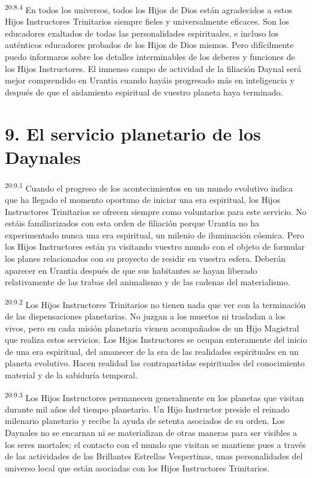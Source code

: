\par
\textsuperscript{20:8.4} En todos los universos, todos los Hijos de Dios están agradecidos a estos Hijos Instructores Trinitarios siempre fieles y universalmente eficaces. Son los educadores exaltados de todas las personalidades espirituales, e incluso los auténticos educadores probados de los Hijos de Dios mismos. Pero difícilmente puedo informaros sobre los detalles interminables de los deberes y funciones de los Hijos Instructores. El inmenso campo de actividad de la filiación Daynal será mejor comprendido en Urantia cuando hayáis progresado más en inteligencia y después de que el aislamiento espiritual de vuestro planeta haya terminado.

\section*{9. El servicio planetario de los Daynales}
\par
\textsuperscript{20:9.1} Cuando el progreso de los acontecimientos en un mundo evolutivo indica que ha llegado el momento oportuno de iniciar una era espiritual, los Hijos Instructores Trinitarios se ofrecen siempre como voluntarios para este servicio. No estáis familiarizados con esta orden de filiación porque Urantia no ha experimentado nunca una era espiritual, un milenio de iluminación cósmica. Pero los Hijos Instructores están ya visitando vuestro mundo con el objeto de formular los planes relacionados con su proyecto de residir en vuestra esfera. Deberán aparecer en Urantia después de que sus habitantes se hayan liberado relativamente de las trabas del animalismo y de las cadenas del materialismo.

\par
\textsuperscript{20:9.2} Los Hijos Instructores Trinitarios no tienen nada que ver con la terminación de las dispensaciones planetarias. No juzgan a los muertos ni trasladan a los vivos, pero en cada misión planetaria vienen acompañados de un Hijo Magistral que realiza estos servicios. Los Hijos Instructores se ocupan enteramente del inicio de una era espiritual, del amanecer de la era de las realidades espirituales en un planeta evolutivo. Hacen realidad las contrapartidas espirituales del conocimiento material y de la sabiduría temporal.

\par
\textsuperscript{20:9.3} Los Hijos Instructores permanecen generalmente en los planetas que visitan durante mil años del tiempo planetario. Un Hijo Instructor preside el reinado milenario planetario y recibe la ayuda de setenta asociados de su orden. Los Daynales no se encarnan ni se materializan de otras maneras para ser visibles a los seres mortales; el contacto con el mundo que visitan se mantiene pues a través de las actividades de las Brillantes Estrellas Vespertinas, unas personalidades del universo local que están asociadas con los Hijos Instructores Trinitarios.

